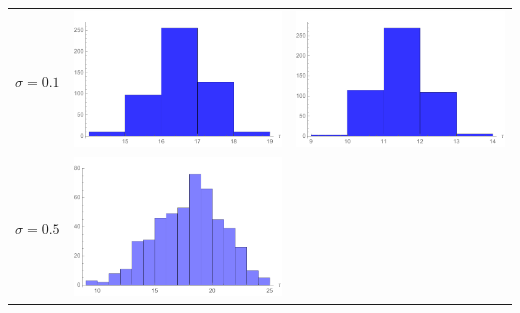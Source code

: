 \begin{table}[!htb]
\begin{tabular}{c|c|c}
\begin{minipage}{.45\textwidth}
		\end{minipage}
		\\ \hline
		$\sigma=0.1$ & 
		\begin{minipage}{.45\textwidth}
			\includegraphics[width=\linewidth]{StopTime/3x001o1.pdf}
		\end{minipage}
		& \begin{minipage}{.45\textwidth}
			\includegraphics[width=\linewidth]{StopTime/3x01o1.pdf}
		\end{minipage}
		\\ \hline
		$\sigma=0.5$ & \begin{minipage}{.45\textwidth}
			\includegraphics[width=\linewidth]{StopTime/3x001o5.pdf}

\end{minipage}
\end{tabular}
\end{table}
